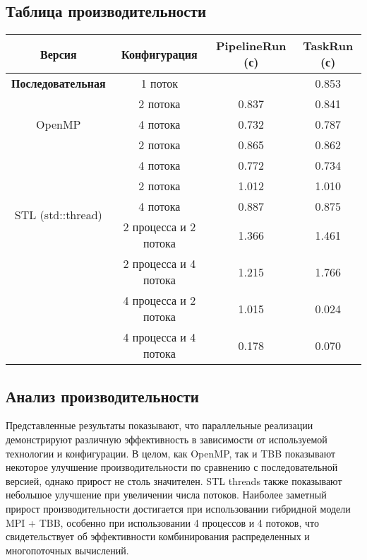 \documentclass[12pt]{article}
\begin{document}
\subsection{Таблица производительности}

\renewcommand{\arraystretch}{1.4}
\begin{table}[H]
\centering
\footnotesize
\begin{tabular}{|c|c|c|c|}
\hline
\textbf{Версия} & \textbf{Конфигурация} & \textbf{PipelineRun (с)} & \textbf{TaskRun (с)} \\
\hline
\textbf{Последовательная} & 1 поток & \centering 0.851 & 0.853 \\
\hline
\multirow{3}{*}{OpenMP} 
  & 2 потока & 0.837 & 0.841 \\
  & 4 потока & 0.732 & 0.787 \\

\hline
\multirow{3}{*}{TBB} 
  & 2 потока & 0.865 & 0.862 \\
  & 4 потока & 0.772 & 0.734 \\

\hline
\multirow{3}{*}{STL (std::thread)} 
  & 2 потока & 1.012 & 1.010 \\
  & 4 потока & 0.887 & 0.875 \\

\hline
\multirow{5}{*}{MPI + STL} 
  & 2 процесса и 2 потока & 1.366 & 1.461 \\
  & 2 процесса и 4 потока & 1.215 & 1.766 \\
  & 4 процесса и 2 потока & 1.015 & 0.024 \\
  & 4 процесса и 4 потока & 0.178 & 0.070 \\
\hline
\end{tabular}
\label{tab:parallel_perf}
\end{table}
\subsection{Анализ производительности}
\hspace*{1.35em}Представленные результаты показывают, что параллельные реализации демонстрируют различную эффективность в зависимости от используемой технологии и конфигурации. В целом, как OpenMP, так и TBB показывают некоторое улучшение производительности по сравнению с последовательной версией, однако прирост не столь значителен. STL threads также показывают небольшое улучшение при увеличении числа потоков. Наиболее заметный прирост производительности достигается при использовании гибридной модели MPI + TBB, особенно при использовании 4 процессов и 4 потоков, что свидетельствует об эффективности комбинирования распределенных и многопоточных вычислений.
\end{document}
